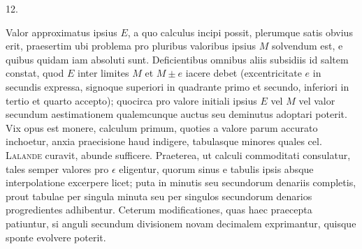 \begin{center}
12.
\end{center}
Valor approximatus ipsius $E$, a quo calculus incipi possit, plerumque satis obvius erit, praesertim ubi problema pro pluribus valoribus ipsius $M$ solvendum est, e quibus quidam iam absoluti sunt. Deficientibus omnibus aliis subsidiis id saltem constat, quod $E$ inter limites $M$ et $M \pm e$ iacere debet (excentricitate $e$ in secundis expressa, signoque superiori in quadrante primo et secundo, inferiori in tertio et quarto accepto); quocirca pro valore initiali ipsius $E$ vel $M$ vel valor secundum aestimationem qualemcunque auctus seu deminutus adoptari poterit. Vix opus est monere, calculum primum, quoties a valore parum accurato inchoetur, anxia praecisione haud indigere, tabulasque minores quales cel. \textsc{Lalande} curavit, abunde sufficere. Praeterea, ut calculi commoditati consulatur, tales semper valores pro $\epsilon$ eligentur, quorum sinus e tabulis ipsis absque interpolatione excerpere licet; puta in minutis seu secundorum denariis completis, prout tabulae per singula minuta seu per singulos secundorum denarios progredientes adhibentur. Ceterum modificationes, quas haec praecepta patiuntur, si anguli secundum divisionem novam decimalem exprimantur, quisque sponte evolvere poterit.
